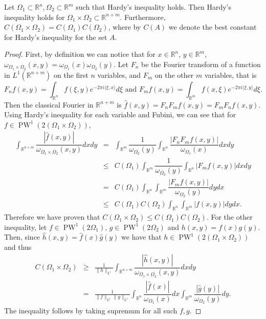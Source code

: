 \documentclass[10pt,a4paper]{amsart}
\DeclareMathOperator{\PW}{PW}
\begin{document}
	\begin{lm}\label{prod}
		Let $\Omega_{1}\subset\mathbb{R}^{n},\Omega_{2}\subset\mathbb{R}^{m}$ such that Hardy's inequality holds. Then Hardy's inequality holds for $\Omega_{1}\times\Omega_{2}\subset \mathbb{R}^{n+m}$. Furthermore, $C(\Omega_1\times \Omega_2)=C(\Omega_1)C(\Omega_2)$, where by $C(A)$ we denote the best constant for Hardy's inequality for the set $A$.
	\end{lm}

	\begin{proof}
		First, by definition we can notice that for $x\in \mathbb{R}^{n}$, $y\in\mathbb{R}^{m}$, $\omega_{\Omega_{1}\times\Omega_{2}}(x,y)=\omega_{\Omega_{1}}(x)\omega_{\Omega_{2}}(y)$. Let $F_n$ be the Fourier transform of a function in $L^{1}(\mathbb{R}^{n+m})$ on the first $n$ variables, and $F_m$ on the other $m$ variables, that is 
		$$F_n f(x,y)=\int_{\mathbb{R}^n}f(\xi,y)e^{-2\pi i \langle \xi,x\rangle}d\xi\text{   and   } F_m f(x,y)=\int_{\mathbb{R}^m}f(x,\xi)e^{-2\pi i \langle \xi,y\rangle}d\xi.$$
		Then the classical Fourier in $\mathbb{R}^{n+m}$ is $\widehat{f}(x,y)=F_n F_m f(x,y)=F_m F_n f(x,y)$. Using Hardy's inequality for each variable and Fubini, we can see that for $f\in\PW^{1}(2(\Omega_{1}\times\Omega_{2}))$,
		\begin{eqnarray}
			\int_{\mathbb{R}^{n+m}}\dfrac{|\widehat{f}(x,y)|}{\omega_{\Omega_1\times\Omega_2}(x,y)}dxdy&=& \int_{\mathbb{R}^{m}}\dfrac{1}{\omega_{\Omega_2}(y)}\int_{\mathbb{R}^{n}}\dfrac{|F_nF_mf(x,y)|}{\omega_{\Omega_1}(x)}dxdy \nonumber \\ &\leq&  C(\Omega_1)\int_{\mathbb{R}^{m}}\dfrac{1}{\omega_{\Omega_2}(y)}\int_{\mathbb{R}^{n}}|F_mf(x,y)|dx dy\nonumber  \\
			&=& C(\Omega_1) \int_{\mathbb{R}^{n}}\int_{\mathbb{R}^{m}}\dfrac{|F_mf(x,y)|}{\omega_{\Omega_2}(y)}dy dx  \nonumber \\
			&\leq& C(\Omega_1)C(\Omega_2) \int_{\mathbb{R}^{n}}\int_{\mathbb{R}^{m}}| f(x,y)|dy dx . \nonumber 
		\end{eqnarray}
		Therefore we have proven that $C(\Omega_1\times\Omega_2)\leq C(\Omega_1)C(\Omega_2)$. For the other inequality, let $f\in \PW^1(2\Omega_1)$, $g\in \PW^1(2\Omega_2)$ and $h(x,y)=f(x)g(y)$. Then, since $\widehat{h}(x,y)=\widehat{f}(x)\widehat{g}(y)$ we have that $h\in \PW^1(2(\Omega_1\times\Omega_2))$ and thus 
		\begin{eqnarray}
			C(\Omega_1\times\Omega_2)&\geq& \frac{1}{\|h\|_{L^1}}	\int_{\mathbb{R}^{n+m}}\dfrac{|\widehat{h}(x,y)|}{\omega_{\Omega_1\times\Omega_2}(x,y)}dxdy \nonumber \\
			&=& \frac{1}{\|f\|_{L^1}\|g\|_{L^1}}	\int_{\mathbb{R}^{n}}\dfrac{|\widehat{f}(x)|}{\omega_{\Omega_1}(x)}dx \int_{\mathbb{R}^{m}}\dfrac{|\widehat{g}(y)|}{\omega_{\Omega_2}(y)}dy. \nonumber 
		\end{eqnarray}
		The inequality follows by taking supremum for all such $f,g$.
	\end{proof}
\end{document}

